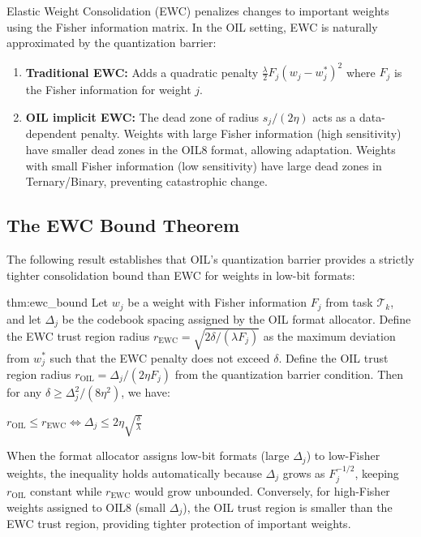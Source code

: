 Elastic Weight Consolidation (EWC) \cite{kirkpatrick2017} penalizes changes to important weights using the Fisher information matrix. In the OIL setting, EWC is naturally approximated by the quantization barrier:

\begin{enumerate}
    \item \textbf{Traditional EWC:} Adds a quadratic penalty $\frac{\lambda}{2} F_j (w_j - w_j^*)^2$ where $F_j$ is the Fisher information for weight $j$.
    \item \textbf{OIL implicit EWC:} The dead zone of radius $s_j/(2\eta)$ acts as a data-dependent penalty. Weights with large Fisher information (high sensitivity) have smaller dead zones in the OIL8 format, allowing adaptation. Weights with small Fisher information (low sensitivity) have large dead zones in Ternary/Binary, preventing catastrophic change.
\end{enumerate}

\subsection{The EWC Bound Theorem}

The following result establishes that OIL's quantization barrier provides a strictly tighter consolidation bound than EWC for weights in low-bit formats:

\begin{mythm}{thm:ewc_bound}
Let $w_j$ be a weight with Fisher information $F_j$ from task $\mathcal{T}_k$, and let $\Delta_j$ be the codebook spacing assigned by the OIL format allocator. Define the EWC trust region radius $r_{\text{EWC}} = \sqrt{2\delta / (\lambda F_j)}$ as the maximum deviation from $w_j^*$ such that the EWC penalty does not exceed $\delta$. Define the OIL trust region radius $r_{\text{OIL}} = \Delta_j / (2\eta F_j)$ from the quantization barrier condition. Then for any $\delta \geq \Delta_j^2 / (8\eta^2)$, we have:

$r_{\text{OIL}} \leq r_{\text{EWC}} \iff \Delta_j \leq 2\eta \sqrt{\frac{\delta}{\lambda}}$

When the format allocator assigns low-bit formats (large $\Delta_j$) to low-Fisher weights, the inequality holds automatically because $\Delta_j$ grows as $F_j^{-1/2}$, keeping $r_{\text{OIL}}$ constant while $r_{\text{EWC}}$ would grow unbounded. Conversely, for high-Fisher weights assigned to OIL8 (small $\Delta_j$), the OIL trust region is smaller than the EWC trust region, providing tighter protection of important weights.
\end{mythm}

